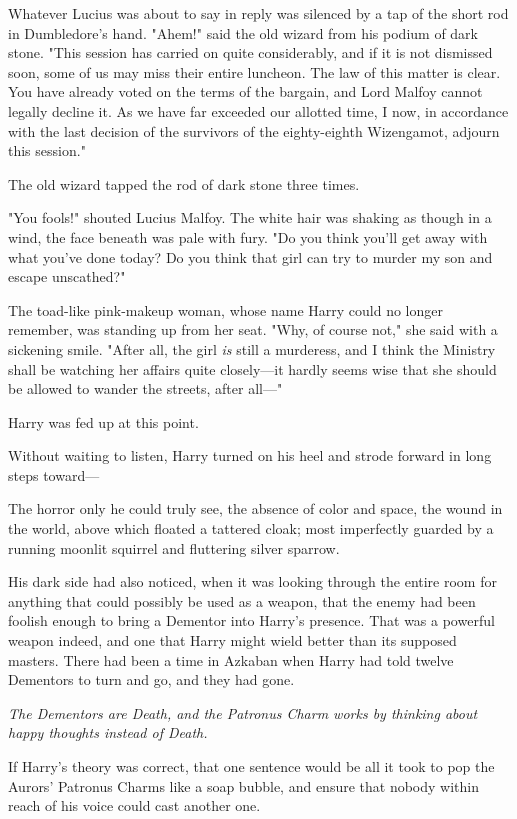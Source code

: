 Whatever Lucius was about to say in reply was silenced by a tap of the short
rod in Dumbledore's hand. "Ahem!" said the old wizard from his podium of dark
stone. "This session has carried on quite considerably, and if it is not
dismissed soon, some of us may miss their entire luncheon. The law of this
matter is clear. You have already voted on the terms of the bargain, and Lord
Malfoy cannot legally decline it. As we have far exceeded our allotted time, I
now, in accordance with the last decision of the survivors of the eighty-eighth
Wizengamot, adjourn this session."

The old wizard tapped the rod of dark stone three times.

"You fools!" shouted Lucius Malfoy. The white hair was shaking as though in a
wind, the face beneath was pale with fury. "Do you think you'll get away with
what you've done today? Do you think that girl can try to murder my son and
escape unscathed?"

The toad-like pink-makeup woman, whose name Harry could no longer remember, was
standing up from her seat. "Why, of course not," she said with a sickening
smile. "After all, the girl \emph{is} still a murderess, and I think the
Ministry shall be watching her affairs quite closely---it hardly seems wise
that she should be allowed to wander the streets, after all---"

Harry was fed up at this point.

Without waiting to listen, Harry turned on his heel and strode forward in long
steps toward---

The horror only he could truly see, the absence of color and space, the wound
in the world, above which floated a tattered cloak; most imperfectly guarded by
a running moonlit squirrel and fluttering silver sparrow.

His dark side had also noticed, when it was looking through the entire room for
anything that could possibly be used as a weapon, that the enemy had been
foolish enough to bring a Dementor into Harry's presence. That was a powerful
weapon indeed, and one that Harry might wield better than its supposed masters.
There had been a time in Azkaban when Harry had told twelve Dementors to turn
and go, and they had gone.

\emph{The Dementors are Death, and the Patronus Charm works by thinking about
happy thoughts instead of Death.}

If Harry's theory was correct, that one sentence would be all it took to pop
the Aurors' Patronus Charms like a soap bubble, and ensure that nobody within
reach of his voice could cast another one.

